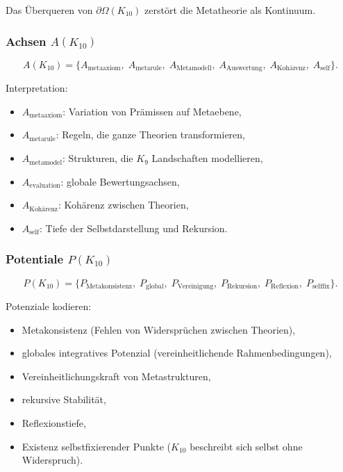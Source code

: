 Das Überqueren von $\partial\Omega(K_{10})$ zerstört die Metatheorie als Kontinuum.

\subsubsection{Achsen $A(K_{10})$}

\[
A(K_{10})=
\{
A_{\mathrm{metaaxiom}},\;
A_{\mathrm{metarule}},\;
A_{\mathrm{Metamodell}},\;
A_{\mathrm{Auswertung}},\;
A_{\mathrm{Kohärenz}},\;
A_{\mathrm{self}}
\}.
\]

Interpretation:
\begin{itemize}
    \item $A_{\mathrm{metaaxiom}}$: Variation von Prämissen auf Metaebene,
    \item $A_{\mathrm{metarule}}$: Regeln, die ganze Theorien transformieren,
    \item $A_{\mathrm{metamodel}}$: Strukturen, die $K_9$ Landschaften modellieren,
    \item $A_{\mathrm{evaluation}}$: globale Bewertungsachsen,
    \item $A_{\mathrm{Kohärenz}}$: Kohärenz zwischen Theorien,
    \item $A_{\mathrm{self}}$: Tiefe der Selbstdarstellung und Rekursion.
\end{itemize}

\subsubsection{Potentiale $P(K_{10})$}

\[
P(K_{10})=
\{
P_{\mathrm{Metakonsistenz}},\;
P_{\mathrm{global}},\;
P_{\mathrm{Vereinigung}},\;
P_{\mathrm{Rekursion}},\;
P_{\mathrm{Reflexion}},\;
P_{\mathrm{selffix}}
\}.
\]

Potenziale kodieren:
\begin{itemize}
    \item Metakonsistenz (Fehlen von Widersprüchen zwischen Theorien),
    \item globales integratives Potenzial (vereinheitlichende Rahmenbedingungen),
    \item Vereinheitlichungskraft von Metastrukturen,
    \item rekursive Stabilität,
    \item Reflexionstiefe,
    \item Existenz selbstfixierender Punkte ($K_{10}$ beschreibt sich selbst ohne Widerspruch).
\end{itemize}


